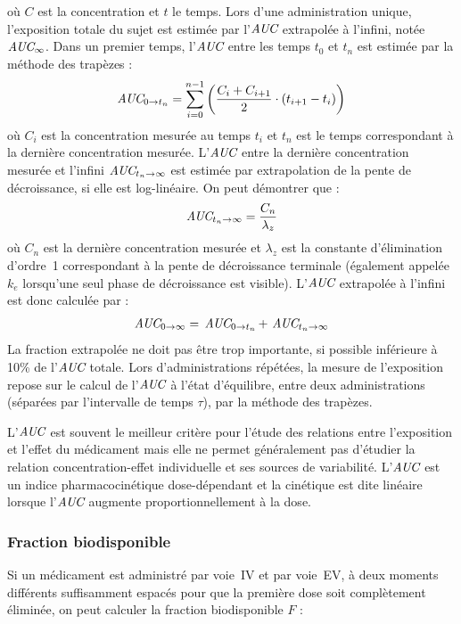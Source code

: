 où $C$ est la concentration et $t$ le temps. Lors d'une administration unique, l'exposition totale du sujet est estimée par l'$\operatorname{\textit{AUC}}$ extrapolée à l'infini, notée $\operatorname{\textit{AUC}}_\infty$. Dans un premier temps, l'$\operatorname{\textit{AUC}}$ entre les temps $t_0$ et $t_n$ est estimée par la méthode des trapèzes :
\begin{equation}
\operatorname{\textit{AUC}}_{0 \to t_n} = \sum_{i=0}^{n-1}\left ( \frac{C_i + C_{i+1}}{2}\cdot \left ( t_{i+1}-t_i \right ) \right )
\label{eq:2}
\end{equation}
où $C_i$ est la concentration mesurée au temps $t_i$ et $t_n$ est le temps correspondant à la dernière concentration mesurée. L'$\operatorname{\textit{AUC}}$ entre la dernière concentration mesurée et l'infini $\operatorname{\textit{AUC}}_{t_{n} \to \infty}$ est estimée par extrapolation de la pente de décroissance, si elle est log-linéaire. On peut démontrer que :
\begin{equation}
\operatorname{\textit{AUC}}_{t_n \to \infty} = \frac{C_n}{\lambda_z}
\label{eq:3}
\end{equation}
où $C_n$ est la dernière concentration mesurée et $\lambda_z$ est la constante d'élimination d'ordre~1 correspondant à la pente de décroissance terminale (également appelée $k_e$ lorsqu'une seul phase de décroissance est visible). L'$\operatorname{\textit{AUC}}$ extrapolée à l'infini est donc calculée par :
\begin{equation}
\operatorname{\textit{AUC}}_{0 \to \infty} =\, \operatorname{\textit{AUC}}_{0 \to t_n} + \, \operatorname{\textit{AUC}}_{t_n \to \infty}
\label{eq:4}
\end{equation}
La fraction extrapolée ne doit pas être trop importante, si possible inférieure à 10\% de l'$\operatorname{\textit{AUC}}$ totale. Lors d'administrations répétées, la mesure de l'exposition repose sur le calcul de l'$\operatorname{\textit{AUC}}$ à l'état d'équilibre, entre deux administrations (séparées par l'intervalle de temps $\tau$), par la méthode des trapèzes.

L'$\operatorname{\textit{AUC}}$ est souvent le meilleur critère pour l'étude des relations entre l'exposition et l'effet du médicament mais elle ne permet généralement pas d'étudier la relation concentration-effet individuelle et ses sources de variabilité. L'$\operatorname{\textit{AUC}}$ est un indice pharmacocinétique dose-dépendant et la cinétique est dite linéaire lorsque l'$\operatorname{\textit{AUC}}$ augmente proportionnellement à la dose.

\subsubsection{Fraction biodisponible}
Si un médicament est administré par voie~IV et par voie~EV, à deux moments différents suffisamment espacés pour que la première dose soit complètement éliminée, on peut calculer la fraction biodisponible $F$ :

